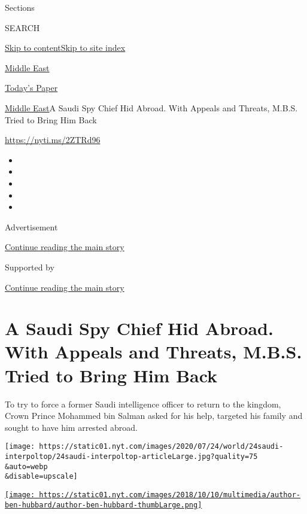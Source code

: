 Sections

SEARCH

\protect\hyperlink{site-content}{Skip to
content}\protect\hyperlink{site-index}{Skip to site index}

\href{https://www.nytimes.com/section/world/middleeast}{Middle East}

\href{https://myaccount.nytimes.com/auth/login?response_type=cookie\&client_id=vi}{}

\href{https://www.nytimes.com/section/todayspaper}{Today's Paper}

\href{/section/world/middleeast}{Middle East}\textbar{}A Saudi Spy Chief
Hid Abroad. With Appeals and Threats, M.B.S. Tried to Bring Him Back

\url{https://nyti.ms/2ZTRd96}

\begin{itemize}
\item
\item
\item
\item
\item
\end{itemize}

Advertisement

\protect\hyperlink{after-top}{Continue reading the main story}

Supported by

\protect\hyperlink{after-sponsor}{Continue reading the main story}

\hypertarget{a-saudi-spy-chief-hid-abroad-with-appeals-and-threats-mbs-tried-to-bring-him-back}{%
\section{A Saudi Spy Chief Hid Abroad. With Appeals and Threats, M.B.S.
Tried to Bring Him
Back}\label{a-saudi-spy-chief-hid-abroad-with-appeals-and-threats-mbs-tried-to-bring-him-back}}

To try to force a former Saudi intelligence officer to return to the
kingdom, Crown Prince Mohammed bin Salman asked for his help, targeted
his family and sought to have him arrested abroad.

\texttt{[image: https://static01.nyt.com/images/2020/07/24/world/24saudi-interpoltop/24saudi-interpoltop-articleLarge.jpg?quality=75\\\&auto=webp\\\&disable=upscale]}

\href{https://www.nytimes.com/by/ben-hubbard}{\texttt{[image: https://static01.nyt.com/images/2018/10/10/multimedia/author-ben-hubbard/author-ben-hubbard-thumbLarge.png]}}

